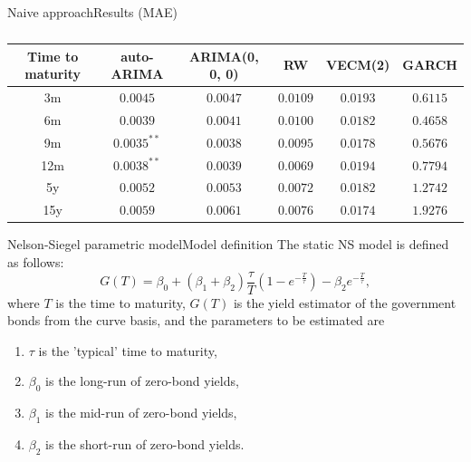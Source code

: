 \documentclass[aspectratio=169]{beamer}
\begin{document}
    \begin{frame}{Naive approach}{Results (MAE)}
        \begin{table}
            \centering
            \begin{tabular}{|c c c c c c|} 
                \hline
                Time to maturity & auto-ARIMA & ARIMA(0, 0, 0) & RW & VECM(2) & GARCH \\
                \hline
                3m & $0.0045$ & $0.0047$ & $0.0109$ & $0.0193$ & $0.6115$ \\ 
                \hline
                6m & $0.0039$  & 0.$0041$ & $0.0100$ & $0.0182$ & $0.4658$ \\
                \hline
                9m & $0.0035^{**}$ & $0.0038$ & $0.0095$ & $0.0178$ & $0.5676$ \\
                \hline
                12m & $0.0038^{**}$ & $0.0039$ & $0.0069$ & $0.0194$ & $0.7794$ \\
                \hline
                5y & $0.0052$ & $0.0053$ & $0.0072$ & $0.0182$ & $1.2742$\\
                \hline
                15y & $0.0059$ & $0.0061$ & $0.0076$ & $0.0174$ & $1.9276$ \\ 
                \hline
            \end{tabular}
            \caption{}
        \end{table}

    \end{frame}

    \begin{frame}{Nelson-Siegel parametric model}{Model definition}
        The static NS model is defined as follows:
            \begin{equation}\label{eq:NS}
                G(T) = \beta_0 + (\beta_1+\beta_2)\frac{\tau}{T}\left(1-e^{-\frac{T}{\tau}}\right)-\beta_2  e^{-\frac{T}{\tau}},
            \end{equation}
            where $T$ is the time to maturity, $G(T)$ is the yield estimator of the government bonds from the curve basis, 
            and the parameters to be estimated are
            \begin{enumerate}
                \item $\tau$ is the 'typical' time to maturity, 
                \item $\beta_0$ is the long-run of zero-bond yields, 
                \item $\beta_1$ is the mid-run of zero-bond yields, 
                \item $\beta_2$ is the short-run of zero-bond yields.
            \end{enumerate}
    \end{frame}
\end{document}
